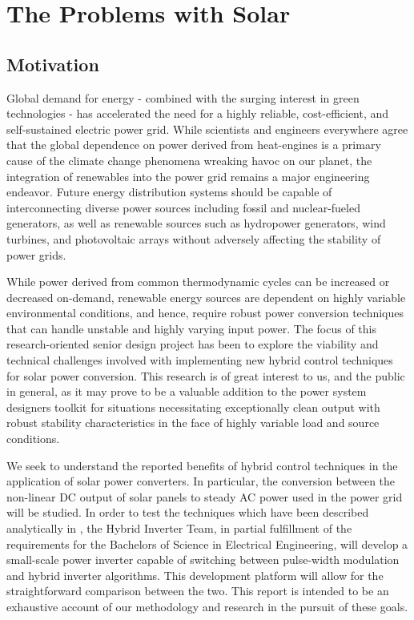 
\chapter{The Problems with Solar} %

\label{Chapter1} %


\section{Motivation}
Global demand for energy - combined with the surging interest in green technologies - has accelerated the need for a highly reliable, cost-efficient, and self-sustained electric power grid. While scientists and engineers everywhere agree that the global dependence on power derived from heat-engines is a primary cause of the climate change phenomena wreaking havoc on our planet, the integration of renewables into the power grid remains a major engineering endeavor. Future energy distribution systems should be capable of interconnecting diverse power sources including fossil and nuclear-fueled generators, as well as renewable sources such as hydropower generators, wind turbines, and photovoltaic arrays without adversely affecting the stability of power grids. 

While power derived from common thermodynamic cycles can be increased or decreased on-demand, renewable energy sources are dependent on highly variable environmental conditions, and hence, require robust power conversion techniques that can handle unstable and highly varying input power\cite{ricardo}. The focus of this research-oriented senior design project has been to explore the viability and technical challenges involved with implementing new hybrid control techniques for solar power conversion. This research is of great interest to us, and the public in general, as it may prove to be a valuable addition to the power system designers toolkit for situations necessitating exceptionally clean output with robust stability characteristics in the face of highly variable load and source conditions.

We seek to understand the reported benefits of hybrid control techniques in the application of solar power converters. In particular, the conversion between the non-linear DC output of solar panels to steady AC power used in the power grid will be studied. In order to test the techniques which have been described analytically in \cite{ricardo}, the Hybrid Inverter Team, in partial fulfillment of the requirements for the Bachelors of Science in Electrical Engineering, will develop a small-scale power inverter capable of switching between pulse-width modulation and hybrid inverter algorithms. This development platform will allow for the straightforward comparison between the two. This report is intended to be an exhaustive account of our methodology and research in the pursuit of these goals.

